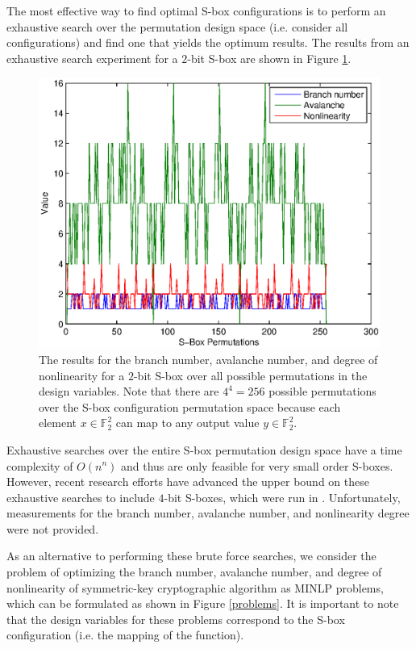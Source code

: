 \documentclass[11pt]{article}
\newcommand{\field}[1]{\mathbb{#1}} %
\begin{document}
The most effective way to find optimal S-box configurations is to perform an exhaustive search over the permutation design space (i.e. consider all configurations) and find one that yields the optimum results. The results from an exhaustive search experiment for a $2$-bit S-box are shown in Figure \ref{bfjoint}.
\begin{figure}[!ht]
	\centering
	\includegraphics[scale=0.65]{images/brute_joint.eps} 

	\caption{The results for the branch number, avalanche number, and degree of nonlinearity for a $2$-bit S-box over all possible permutations in the design variables. Note that there are $4^4 = 256$ possible permutations over the S-box configuration permutation space because each element $x \in \field{F}_2^2$ can map to any output value $y \in \field{F}_2^2$.}
	\label{bfjoint}
\end{figure}
Exhaustive searches over the entire S-box permutation design space have a time complexity of $O(n^n)$ and thus are only feasible for very small order S-boxes. However, recent research efforts have advanced the upper bound on these exhaustive searches to include $4$-bit S-boxes, which were run in \cite{Sbox4x4}. Unfortunately, measurements for the branch number, avalanche number, and nonlinearity degree were not provided. 

As an alternative to performing these brute force searches, we consider the problem of optimizing the branch number, avalanche number, and degree of nonlinearity of symmetric-key cryptographic algorithm as MINLP problems, which can be formulated as shown in Figure \ref{problems}. It is important to note that the design variables for these problems correspond to the S-box configuration (i.e. the mapping of the function).
\end{document}
